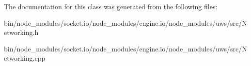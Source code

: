 The documentation for this class was generated from the following files\+:\begin{DoxyCompactItemize}
\item 
bin/node\+\_\+modules/socket.\+io/node\+\_\+modules/engine.\+io/node\+\_\+modules/uws/src/Networking.\+h\item 
bin/node\+\_\+modules/socket.\+io/node\+\_\+modules/engine.\+io/node\+\_\+modules/uws/src/Networking.\+cpp\end{DoxyCompactItemize}

